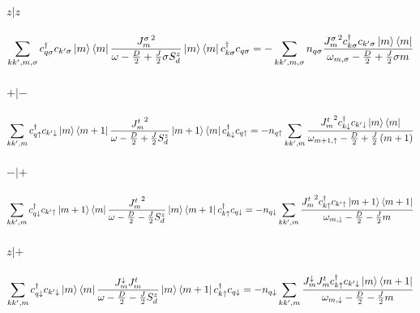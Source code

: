 \documentclass[12pt]{revtex4-2}
\begin{document}
\paragraph{\(z|z\)}
\begin{equation}\begin{aligned}
	\sum_{kk^\prime,m,\sigma} c^\dagger_{q \sigma} c_{k^\prime \sigma} \ket{m}\bra{m}\frac{{J^\sigma_m}^2}{\omega - \frac{D}{2} + \frac{J}{2}\sigma S_d^z}\ket{m}\bra{m} c^\dagger_{k \sigma}c_{q \sigma} = -\sum_{kk^\prime,m,\sigma}n_{q \sigma}\frac{{J^\sigma_m}^2 c^\dagger_{k \sigma}c_{k^\prime\sigma} \ket{m}\bra{m}}{\omega_{m, \sigma} - \frac{D}{2} + \frac{J}{2}\sigma m}
\end{aligned}\end{equation}

\paragraph{\(+|-\)}
\begin{equation}\begin{aligned}
	\sum_{kk^\prime,m} c^\dagger_{q \uparrow} c_{k^\prime \downarrow} \ket{m}\bra{m+1}\frac{{J^t_m}^2}{\omega - \frac{D}{2} + \frac{J}{2}S_d^z}\ket{m+1}\bra{m} c^\dagger_{k \downarrow}c_{q \uparrow} = -n_{q \uparrow}\sum_{kk^\prime,m}\frac{{J^t_m}^2 c^\dagger_{k \downarrow}c_{k^\prime\downarrow} \ket{m}\bra{m}}{\omega_{m+1, \uparrow} - \frac{D}{2} + \frac{J}{2}\left( m+1 \right) }
\end{aligned}\end{equation}

\paragraph{\(-|+\)}
\begin{equation}\begin{aligned}
	\sum_{kk^\prime,m} c^\dagger_{q \downarrow} c_{k^\prime \uparrow} \ket{m+1}\bra{m}\frac{{J^t_m}^2}{\omega - \frac{D}{2} - \frac{J}{2}S_d^z}\ket{m}\bra{m+1} c^\dagger_{k \uparrow}c_{q \downarrow} = -n_{q \downarrow}\sum_{kk^\prime,m}\frac{{J^t_m}^2 c^\dagger_{k \uparrow}c_{k^\prime\uparrow} \ket{m+1}\bra{m+1}}{\omega_{m, \downarrow} - \frac{D}{2} - \frac{J}{2}m}
\end{aligned}\end{equation}

\paragraph{\(z|+\)}
\begin{equation}\begin{aligned}
	\sum_{kk^\prime,m} c^\dagger_{q \downarrow} c_{k^\prime \downarrow} \ket{m}\bra{m}\frac{J^\downarrow_m{J^t_m}}{\omega - \frac{D}{2} - \frac{J}{2}S_d^z}\ket{m}\bra{m+1} c^\dagger_{k \uparrow}c_{q \downarrow} = -n_{q \downarrow}\sum_{kk^\prime,m}\frac{J^\downarrow_m J^t_m c^\dagger_{k \uparrow}c_{k^\prime\downarrow} \ket{m}\bra{m+1}}{\omega_{m, \downarrow} - \frac{D}{2} - \frac{J}{2}m}
\end{aligned}\end{equation}
\end{document}
